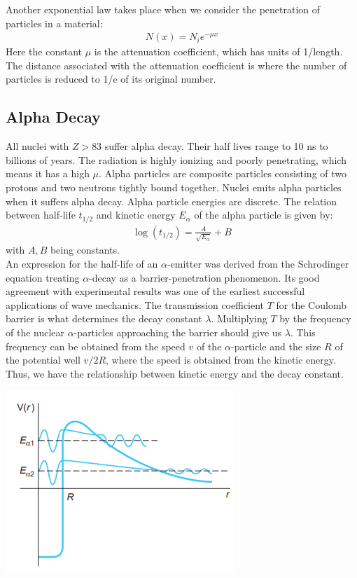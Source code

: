 \documentclass[11pt]{article}
\theoremstyle{break}
\theoremstyle{break}
\begin{document}
Another exponential law takes place when we consider the penetration of particles in a material:
\begin{align*}
N(x) = N_i e^{-\mu x}
\end{align*}
Here the constant $\mu$ is the attenuation coefficient, which has units of 1/length. The distance associated with the attenuation coefficient is where the number of particles is reduced to 1/e of its original number. \\

\subsection*{Alpha Decay}
All nuclei with $Z>83$ suffer alpha decay. Their half lives range to 10 ns to billions of years. The radiation is highly ionizing and poorly penetrating, which means it has a high $\mu$. Alpha particles are composite particles consisting of two protons and two neutrons tightly bound together. Nuclei emits alpha particles when it suffers alpha decay. Alpha particle energies are discrete. The relation between half-life $t_{1/2}$ and kinetic energy $E_{\alpha} $ of the alpha particle is given by:
\begin{align*}
\log(t_{1/2}) = \frac{A}{\sqrt{E_\alpha}} + B
\end{align*}
with $A,B$ being constants.\\

An expression for the half-life of an $\alpha$-emitter was derived from the Schrodinger equation treating $\alpha$-decay as a barrier-penetration phenomenon. Its good agreement with experimental results was one of the earliest successful applications of wave mechanics. The transmission coefficient $T$ for the Coulomb barrier is what determines the decay constant $\lambda$. Multiplying $T$ by the frequency of the nuclear $\alpha$-particles approaching the barrier should give us $\lambda$. This frequency can be obtained from the speed $v$ of the $\alpha$-particle and the size $R$ of the potential well $v/2R$, where the speed is obtained from the kinetic energy. Thus, we have the relationship between kinetic energy and the decay constant.
\begin{center}
\includegraphics[scale=0.95]{AlphaBarrier}
\end{center}
\end{document}
